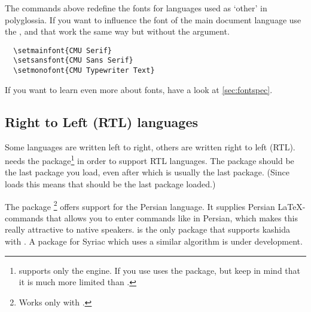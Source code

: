The commands above redefine the fonts for languages used as \enquote*{other} in
polyglossia. If you want to influence the font of the main document language
use the ,  and  that work the
same way but without the  argument.
\begin{verbatim}
  \setmainfont{CMU Serif}
  \setsansfont{CMU Sans Serif}
  \setmonofont{CMU Typewriter Text}
\end{verbatim}

If you want to learn even more about fonts, have a look at
\autoref{sec:fontspec}.

\subsection{Right to Left (RTL) languages}

Some languages are written left to right, others are written right to left
(RTL).  needs the  package\footnote{
  supports only the  engine. If you use 
   uses the  package, but keep in mind that it is
  much more limited than .} in order to support RTL languages. The
 package should be the last package you load, even after
 which is usually the last package. (Since 
loads  this means that  should be the last package
loaded.)


The package \footnote{Works only with
  .} offers support for the Persian language. It
supplies Persian \LaTeX-commands that allows you to enter commands like
 in Persian, which makes this really attractive to native speakers.
 is the only package that supports kashida with
. A package for Syriac which uses a similar algorithm is under
development.

